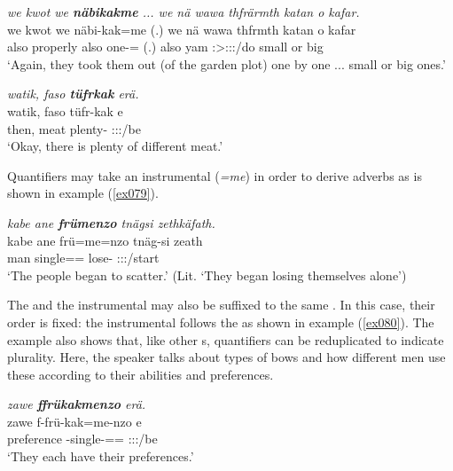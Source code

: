 \begin{exe}
	\ex \emph{we kwot we \textbf{näbikakme} ... we nä wawa thfrärmth katan o kafar.}\\
	\gll we kwot we näbi-kak=me (.) we nä wawa thfrmth katan o kafar\\
	also properly also one-\Distr=\Ins{} (.) also \Indf{} yam \Stpl:\Sbj>\Stpl:\Obj:\Pst:\Dur/do small or big\\
	\trans `Again, they took them out (of the garden plot) one by one ... small or big ones.' 
	\label{ex742}
\end{exe}
\begin{exe}
	\ex \emph{watik, faso \textbf{tüfrkak} erä.}\\
	\gll watik, faso tüfr-kak e\\
	then, meat plenty-\Distr{} \Stpl:\Sbj:\Nonpast:\Ipfv/be\\
	\trans `Okay, there is plenty of different meat.' 
	\label{ex078}
\end{exe}

Quantifiers may take an instrumental  (\emph{=me}) in order to derive adverbs as is shown in example (\ref{ex079}).

\begin{exe}
	\ex \emph{kabe ane \textbf{frümenzo} tnägsi zethkäfath.}\\
	\gll kabe ane frü=me=nzo tnäg-si zeath\\
	man \Dem{} single=\Ins=\Only{} lose-\Nmlz{} \Stpl{}:\Sbj:\Pst:\Ipfv{}/start\\
	\trans `The people began to scatter.' (Lit. `They began losing themselves alone')\\ 
	\label{ex079}
\end{exe}

The  and the instrumental may also be suffixed to the same . In this case, their order is fixed: the instrumental follows the  as shown in example (\ref{ex080}). The example also shows that, like other s, quantifiers can be reduplicated to indicate plurality. Here, the speaker talks about types of bows and how different men use these according to their abilities and preferences.

\begin{exe}
	\ex \emph{zawe \textbf{ffrükakmenzo} erä.}\\
	\gll zawe f-frü-kak=me-nzo e\\
	preference \Redup-single-\Distr=\Ins=\Only{} \Stpl:\Sbj:\Nonpast:\Ipfv/be\\
	\trans `They each have their preferences.' 
	\label{ex080}
\end{exe}

